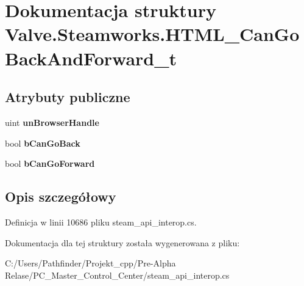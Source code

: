 \hypertarget{struct_valve_1_1_steamworks_1_1_h_t_m_l___can_go_back_and_forward__t}{}\section{Dokumentacja struktury Valve.\+Steamworks.\+H\+T\+M\+L\+\_\+\+Can\+Go\+Back\+And\+Forward\+\_\+t}
\label{struct_valve_1_1_steamworks_1_1_h_t_m_l___can_go_back_and_forward__t}
\subsection*{Atrybuty publiczne}
\begin{DoxyCompactItemize}
\item 
\mbox{\label{struct_valve_1_1_steamworks_1_1_h_t_m_l___can_go_back_and_forward__t_a2ea4c2182daf33f8373dcef8123bd94c}} 
uint {\bfseries un\+Browser\+Handle}
\item 
\mbox{\label{struct_valve_1_1_steamworks_1_1_h_t_m_l___can_go_back_and_forward__t_aa454a8a93409d6968ba45e1b7023f5e2}} 
bool {\bfseries b\+Can\+Go\+Back}
\item 
\mbox{\label{struct_valve_1_1_steamworks_1_1_h_t_m_l___can_go_back_and_forward__t_aefac452591a5d3ff0d69b5c6dbbb65ae}} 
bool {\bfseries b\+Can\+Go\+Forward}
\end{DoxyCompactItemize}


\subsection{Opis szczegółowy}


Definicja w linii 10686 pliku steam\+\_\+api\+\_\+interop.\+cs.



Dokumentacja dla tej struktury została wygenerowana z pliku\+:\begin{DoxyCompactItemize}
\item 
C\+:/\+Users/\+Pathfinder/\+Projekt\+\_\+cpp/\+Pre-\/\+Alpha Relase/\+P\+C\+\_\+\+Master\+\_\+\+Control\+\_\+\+Center/steam\+\_\+api\+\_\+interop.\+cs\end{DoxyCompactItemize}
